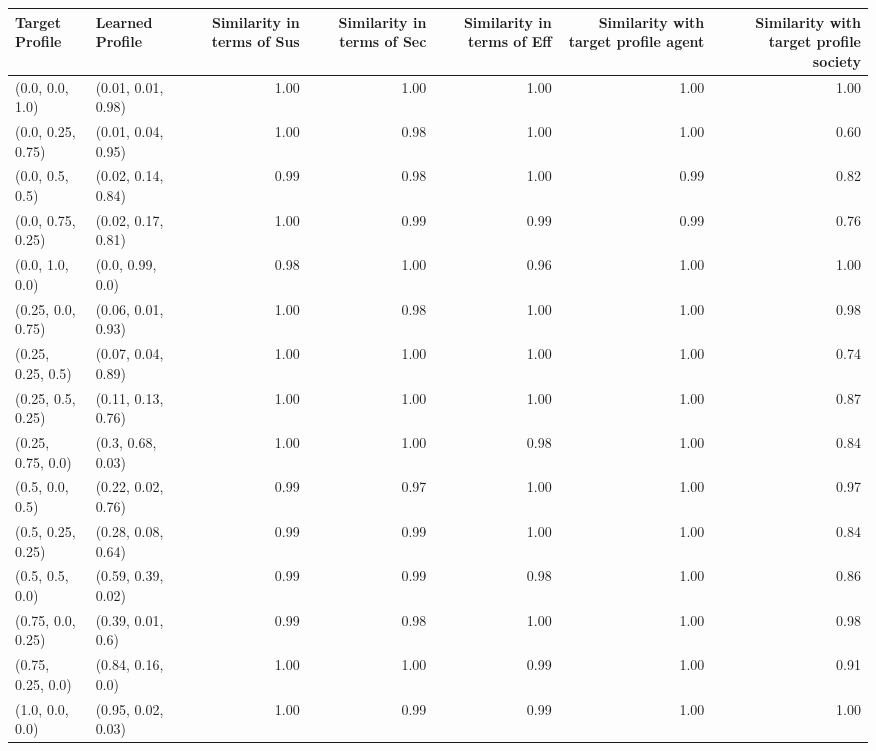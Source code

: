 \begin{tabular}{llrrrrr}
\toprule
Target Profile & Learned Profile & Similarity in terms of Sus & Similarity in terms of Sec & Similarity in terms of Eff & Similarity with target profile agent & Similarity with target profile society \\
\midrule
(0.0, 0.0, 1.0) & (0.01, 0.01, 0.98) & 1.00 & 1.00 & 1.00 & 1.00 & 1.00 \\
(0.0, 0.25, 0.75) & (0.01, 0.04, 0.95) & 1.00 & 0.98 & 1.00 & 1.00 & 0.60 \\
(0.0, 0.5, 0.5) & (0.02, 0.14, 0.84) & 0.99 & 0.98 & 1.00 & 0.99 & 0.82 \\
(0.0, 0.75, 0.25) & (0.02, 0.17, 0.81) & 1.00 & 0.99 & 0.99 & 0.99 & 0.76 \\
(0.0, 1.0, 0.0) & (0.0, 0.99, 0.0) & 0.98 & 1.00 & 0.96 & 1.00 & 1.00 \\
(0.25, 0.0, 0.75) & (0.06, 0.01, 0.93) & 1.00 & 0.98 & 1.00 & 1.00 & 0.98 \\
(0.25, 0.25, 0.5) & (0.07, 0.04, 0.89) & 1.00 & 1.00 & 1.00 & 1.00 & 0.74 \\
(0.25, 0.5, 0.25) & (0.11, 0.13, 0.76) & 1.00 & 1.00 & 1.00 & 1.00 & 0.87 \\
(0.25, 0.75, 0.0) & (0.3, 0.68, 0.03) & 1.00 & 1.00 & 0.98 & 1.00 & 0.84 \\
(0.5, 0.0, 0.5) & (0.22, 0.02, 0.76) & 0.99 & 0.97 & 1.00 & 1.00 & 0.97 \\
(0.5, 0.25, 0.25) & (0.28, 0.08, 0.64) & 0.99 & 0.99 & 1.00 & 1.00 & 0.84 \\
(0.5, 0.5, 0.0) & (0.59, 0.39, 0.02) & 0.99 & 0.99 & 0.98 & 1.00 & 0.86 \\
(0.75, 0.0, 0.25) & (0.39, 0.01, 0.6) & 0.99 & 0.98 & 1.00 & 1.00 & 0.98 \\
(0.75, 0.25, 0.0) & (0.84, 0.16, 0.0) & 1.00 & 1.00 & 0.99 & 1.00 & 0.91 \\
(1.0, 0.0, 0.0) & (0.95, 0.02, 0.03) & 1.00 & 0.99 & 0.99 & 1.00 & 1.00 \\
\bottomrule
\end{tabular}
